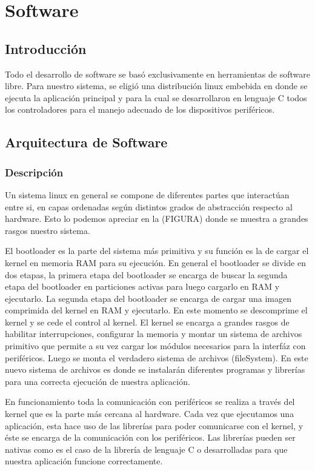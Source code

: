 \chapter{Software}

\section{Introducción}
Todo el desarrollo de software se basó exclusivamente en herramientas de software libre. Para nuestro sistema, se eligió una distribución linux embebida en donde se ejecuta la aplicación principal y para la cual se desarrollaron en lenguaje C todos los controladores para el manejo adecuado de los dispositivos periféricos.
\section{Arquitectura de Software}
\subsection{Descripción}
Un sistema linux en general se compone de diferentes partes que interactúan entre si, en capas  ordenadas según distintos grados de abstracción respecto al hardware. Esto lo podemos apreciar en la (FIGURA) donde se muestra a grandes rasgos nuestro sistema. 

El bootloader es la parte del sistema más primitiva y su función es la de cargar el kernel en memoria RAM para su ejecución. En general el bootloader se divide en dos etapas, la primera etapa del bootloader se encarga de buscar la segunda etapa del bootloader en particiones activas para luego cargarlo en RAM y ejecutarlo. La segunda etapa del bootloader se encarga de cargar una imagen comprimida del kernel en RAM y ejecutarlo. En este momento se descomprime el kernel y se cede el control al kernel.
El kernel se encarga a grandes rasgos de habilitar interrupciones, configurar la memoria y montar un sistema de archivos primitivo que permite a su vez cargar los módulos necesarios para la interfáz con periféricos. Luego se monta el verdadero sistema de archivos (fileSystem). En este nuevo sistema de archivos es donde se instalarán diferentes programas y librerías para una correcta ejecución de nuestra aplicación.

En funcionamiento toda la comunicación con periféricos se realiza a través del kernel que es la parte más cercana al hardware.
Cada vez que ejecutamos una aplicación, esta hace uso de las librerías para poder comunicarse con el kernel, y éste se encarga de la comunicación con los periféricos. Las librerías pueden ser nativas como es el caso de la librería de lenguaje C  o desarrolladas para que nuestra aplicación funcione correctamente.
